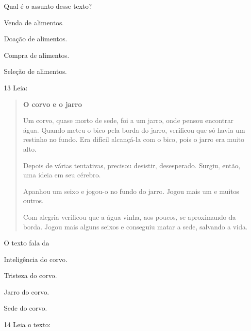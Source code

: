 
Qual é o assunto desse texto?

\begin{escolha}
\item Venda de alimentos.

\item Doação de alimentos.

\item Compra de alimentos.

\item Seleção de alimentos.
\end{escolha}


\num{13} Leia:

\begin{quote}
\textbf{O corvo e o jarro}

Um corvo, quase morto de sede, foi a um jarro, onde pensou encontrar
água. Quando meteu o bico pela borda do jarro, verificou que só havia um
restinho no fundo. Era difícil alcançá-la com o bico, pois o jarro era
muito alto.

Depois de várias tentativas, precisou desistir, desesperado. Surgiu,
então, uma ideia em seu cérebro.

Apanhou um seixo e jogou-o no fundo do jarro. Jogou mais
um e muitos outros.

Com alegria verificou que a água vinha, aos poucos, se aproximando da
borda. Jogou mais alguns seixos e conseguiu matar a sede, salvando a
vida.
\end{quote}


O texto fala da

\begin{escolha}
\item Inteligência do corvo.

\item Tristeza do corvo.

\item Jarro do corvo.

\item Sede do corvo.
\end{escolha}

\num{14} Leia o texto:


